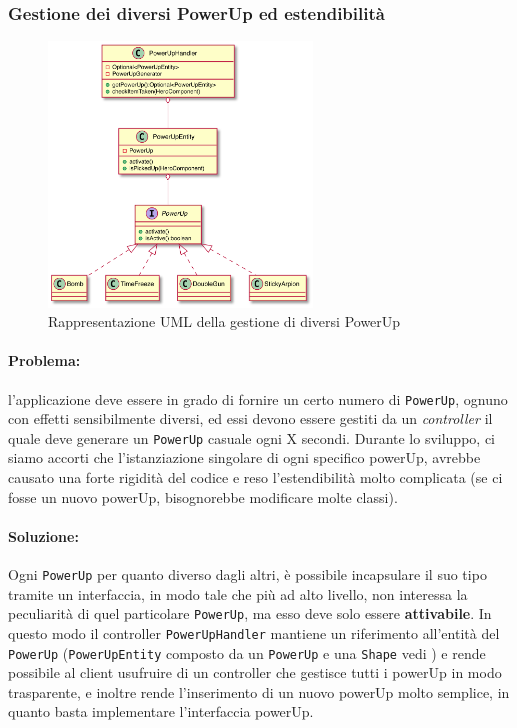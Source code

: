 \documentclass[a4paper,12pt]{report}
\begin{document}
\subsubsection{Gestione dei diversi PowerUp ed estendibilità}
\begin{figure}[H]
\centering{}
\includegraphics[width=7cm]{img/PowerUpStructure.png}
\caption{Rappresentazione UML della gestione di diversi PowerUp}
\end{figure}

\paragraph{Problema:} l'applicazione deve essere in grado di fornire un certo numero di \texttt{PowerUp}, ognuno con effetti sensibilmente diversi, ed essi devono essere gestiti da un \emph{controller} il quale deve generare un \texttt{PowerUp} casuale ogni X secondi. Durante lo sviluppo, ci siamo accorti che l'istanziazione singolare di ogni specifico powerUp, avrebbe causato una forte rigidità del codice e reso l'estendibilità molto complicata (se ci fosse un nuovo powerUp, bisognorebbe modificare molte classi).

\paragraph{Soluzione:} Ogni \texttt{PowerUp} per quanto diverso dagli altri, è possibile incapsulare il suo tipo tramite un interfaccia, in modo tale che più ad alto livello, non interessa la peculiarità di quel particolare \texttt{PowerUp}, ma esso deve solo essere \textbf{attivabile}. In questo modo il controller \texttt{PowerUpHandler} mantiene un riferimento all'entità del \texttt{PowerUp} (\texttt{PowerUpEntity} composto da un \texttt{PowerUp} e una \texttt{Shape} vedi ) e rende possibile al client usufruire di un controller che gestisce tutti i powerUp in modo  trasparente, e inoltre rende l'inserimento di un nuovo powerUp molto semplice, in quanto basta implementare l'interfaccia powerUp.
\end{document}
